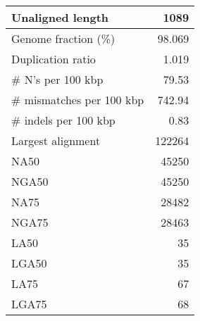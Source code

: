 \documentclass[12pt,a4paper]{article}
\begin{document}
\begin{table}[ht]
\begin{center}
\begin{tabular}{|l*{1}{|r}|}
Unaligned length & 1089 \\ \hline
Genome fraction (\%) & 98.069 \\ \hline
Duplication ratio & 1.019 \\ \hline
\# N's per 100 kbp & 79.53 \\ \hline
\# mismatches per 100 kbp & 742.94 \\ \hline
\# indels per 100 kbp & 0.83 \\ \hline
Largest alignment & 122264 \\ \hline
NA50 & 45250 \\ \hline
NGA50 & 45250 \\ \hline
NA75 & 28482 \\ \hline
NGA75 & 28463 \\ \hline
LA50 & 35 \\ \hline
LGA50 & 35 \\ \hline
LA75 & 67 \\ \hline
LGA75 & 68 \\ \hline
\end{tabular}
\end{center}
\end{table}
\end{document}

